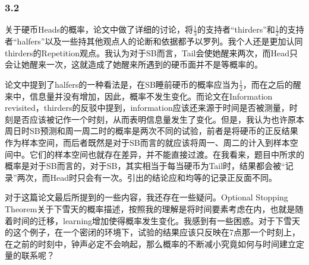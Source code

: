 \begin{appendix}
		\subsubsection{3.2}
		关于硬币Heads的概率，论文中做了详细的讨论，将$\frac{1}{3}$的支持者“thirders”和$\frac{1}{2}$的支持者“halfers”以及一些持其他观点人的论断和依据都予以罗列。我个人还是更加认同thirders的Repetition观点。我认为对于SB而言，Tail会使她醒来两次，而Head只会让她醒来一次，这就造成了她醒来所遇到的硬币面并不是等概率的。\par
		论文中提到了halfers的一种看法是，在SB睡前硬币的概率应当为$\frac{1}{2}$，而在之后的醒来中，信息量并没有增加，因此，概率不发生变化。而论文在Information revisited，thirders的反驳中提到，information应该还来源于时间是否被测量，时刻是否应该被记作一个时刻，从而表明信息量发生了变化。但是，我认为也许原本周日时SB预测和周一周二时的概率是两次不同的试验，前者是将硬币的正反结果作为样本空间，而后者既然是对于SB而言的就应该将周一、周二的计入到样本空间中。它们的样本空间也就存在差异，并不能直接过渡。在我看来，题目中所求的概率是对于SB而言的，对于SB，其实相当于每当硬币为Tail时，结果都会被“记录”两次，而Head时只会有一次。引出的结论应和均等的记录正反面不同。\par
		对于这篇论文最后所提到的一些内容，我还存在一些疑问。Optional Stopping Theorem关于下雪天的概率描述，按照我的理解是将时间要素考虑在内，也就是随着时间的迁移，learning增加使得概率发生变化。我感到有一些困惑。对于下雪天的这个例子，在一个密闭的环境下，试验的结果应该只反映在7点那一个时刻上，在之前的时刻中，钟声必定不会响起，那么概率的不断减小究竟如何与时间建立定量的联系呢？

\end{appendix}


